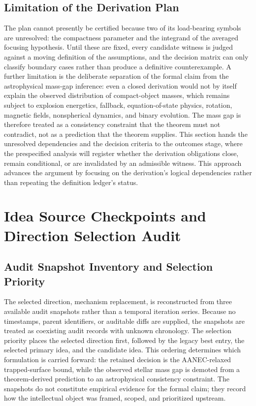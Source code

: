 \documentclass[conference]{IEEEtran}
\begin{document}
\subsection{Limitation of the Derivation Plan}
The plan cannot presently be certified because two of its load-bearing symbols are unresolved: the compactness parameter and the integrand of the averaged focusing hypothesis. Until these are fixed, every candidate witness is judged against a moving definition of the assumptions, and the decision matrix can only classify boundary cases rather than produce a definitive counterexample. A further limitation is the deliberate separation of the formal claim from the astrophysical mass-gap inference: even a closed derivation would not by itself explain the observed distribution of compact-object masses, which remains subject to explosion energetics, fallback, equation-of-state physics, rotation, magnetic fields, nonspherical dynamics, and binary evolution. The mass gap is therefore treated as a consistency constraint that the theorem must not contradict, not as a prediction that the theorem supplies. This section hands the unresolved dependencies and the decision criteria to the outcomes stage, where the prespecified analysis will register whether the derivation obligations close, remain conditional, or are invalidated by an admissible witness. This approach advances the argument by focusing on the derivation's logical dependencies rather than repeating the definition ledger's status.~\cite{cite_0ed84243cf171bc4,cite_7a407c865faafd11}

\appendices
\section{Idea Source Checkpoints and Direction Selection Audit}
\subsection{Audit Snapshot Inventory and Selection Priority}
The selected direction, mechanism replacement, is reconstructed from three available audit snapshots rather than a temporal iteration series. Because no timestamps, parent identifiers, or auditable diffs are supplied, the snapshots are treated as coexisting audit records with unknown chronology. The selection priority places the selected direction first, followed by the legacy best entry, the selected primary idea, and the candidate idea. This ordering determines which formulation is carried forward: the retained decision is the AANEC-relaxed trapped-surface bound, while the observed stellar mass gap is demoted from a theorem-derived prediction to an astrophysical consistency constraint. The snapshots do not constitute empirical evidence for the formal claim; they record how the intellectual object was framed, scoped, and prioritized upstream.
\end{document}
